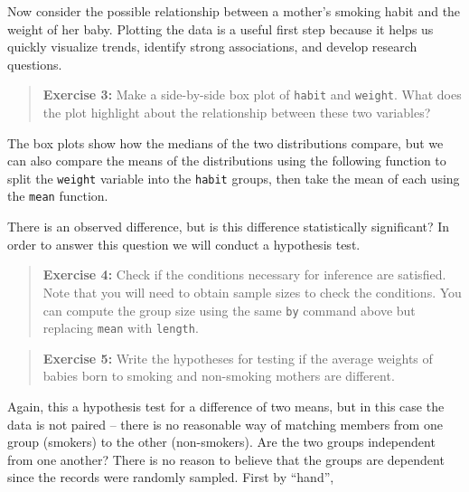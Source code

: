 \documentclass[]{book}
\newenvironment{Shaded}{\begin{snugshade}}{\end{snugshade}}
\newcommand{\KeywordTok}[1]{\textcolor[rgb]{0.13,0.29,0.53}{\textbf{#1}}}
\newcommand{\NormalTok}[1]{#1}
\newcommand{\OperatorTok}[1]{\textcolor[rgb]{0.81,0.36,0.00}{\textbf{#1}}}
\theoremstyle{definition}
\theoremstyle{definition}
\theoremstyle{definition}
\theoremstyle{remark}
\begin{document}
Now consider the possible relationship between a mother's smoking habit
and the weight of her baby. Plotting the data is a useful first step
because it helps us quickly visualize trends, identify strong
associations, and develop research questions.

\begin{quote}
\textbf{Exercise 3:} Make a side-by-side box plot of \texttt{habit} and
\texttt{weight}. What does the plot highlight about the relationship
between these two variables?
\end{quote}

The box plots show how the medians of the two distributions compare, but
we can also compare the means of the distributions using the following
function to split the \texttt{weight} variable into the \texttt{habit}
groups, then take the mean of each using the \texttt{mean} function.

\begin{Shaded}
\end{Shaded}

There is an observed difference, but is this difference statistically
significant? In order to answer this question we will conduct a
hypothesis test.

\begin{quote}
\textbf{Exercise 4:} Check if the conditions necessary for inference are
satisfied. Note that you will need to obtain sample sizes to check the
conditions. You can compute the group size using the same \texttt{by}
command above but replacing \texttt{mean} with \texttt{length}.
\end{quote}

\begin{quote}
\textbf{Exercise 5:} Write the hypotheses for testing if the average
weights of babies born to smoking and non-smoking mothers are different.
\end{quote}

Again, this a hypothesis test for a difference of two means, but in this
case the data is not paired -- there is no reasonable way of matching
members from one group (smokers) to the other (non-smokers). Are the two
groups independent from one another? There is no reason to believe that
the groups are dependent since the records were randomly sampled. First
by ``hand'',
\end{document}

